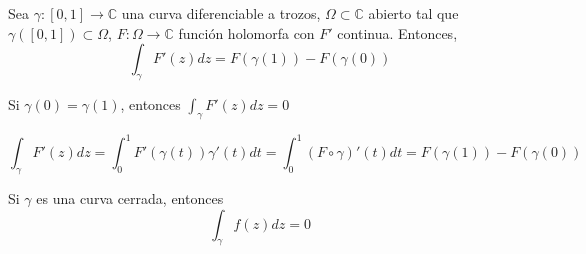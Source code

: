 \begin{theo}
  Sea $\gamma: [0,1] \to \mathbb{C}$ una curva diferenciable a trozos, $\Omega \subset \mathbb{C}$ abierto tal que $\gamma([0,1]) \subset \Omega$, $F: \Omega \to \mathbb{C}$ función holomorfa con $F'$ continua. Entonces,
  \[ 
    \int_{\gamma}^{} F'(z) dz = F(\gamma(1)) - F(\gamma(0)) 
  \] 
\end{theo}

\begin{obs}
  Si $\gamma(0) = \gamma(1)$, entonces $\int_{\gamma}^{} F'(z) dz = 0$
\end{obs}

\begin{dem}
  \[ 
    \int_{\gamma}^{} F'(z) dz = \int_{0}^{1} F'(\gamma(t))\gamma'(t) dt = \int_{0}^{1} (F \circ \gamma)'(t) dt = F(\gamma(1)) - F(\gamma(0))
  \] 
\end{dem}

\begin{cor}
  Si $\gamma$ es una curva cerrada, entonces
  \[ 
    \int_{\gamma}^{} f(z) dz= 0 
  \] 
\end{cor}
